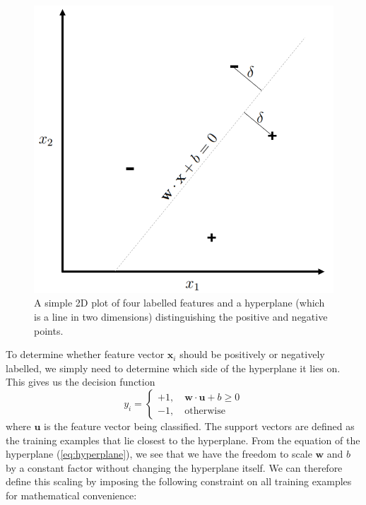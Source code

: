 \documentclass[12pt,a4paper,twoside,openright]{report}
\begin{document}
\begin{figure}
	\begin{center}
		\includegraphics[scale=0.6]{figs/hyperplane.png}
	\end{center}
	\caption{A simple 2D plot of four labelled features and a hyperplane (which is a line in two dimensions) distinguishing the positive and negative points.}
	\label{fig:hyperplane}
\end{figure}
\newline
\newline
To determine whether feature vector $\mathbf{x}_i$ should be positively or negatively labelled, we simply need to determine which side of the hyperplane it lies on. This gives us the decision function
\begin{equation} \label{eq:initialdecision}
	y_i =
	\begin{cases}
		+1, \quad \mathbf{w} \cdot \mathbf{u} + b \ge 0 \\
		-1, \quad \text{otherwise}
	\end{cases}
\end{equation}
where $\mathbf{u}$ is the feature vector being classified. The support vectors are defined as the training examples that lie closest to the hyperplane. From the equation of the hyperplane (\ref{eq:hyperplane}), we see that we have the freedom to scale $\mathbf{w}$ and $b$ by a constant factor without changing the hyperplane itself. We can therefore define this scaling by imposing the following constraint on all training examples for mathematical convenience:
\end{document}
